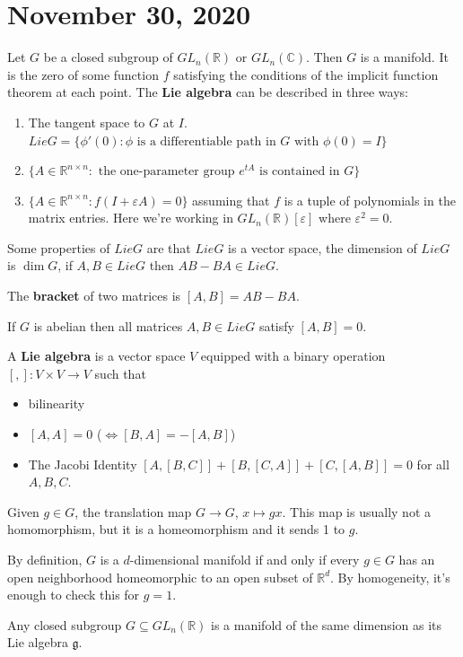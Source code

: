 \documentclass{article}
\newcommand{\vocab}[1]{\textbf{\color{blue!90}\boldmath #1}}
\newcommand{\C}{\mathbb{C}}
\newcommand{\R}{\mathbb{R}}
\newcommand{\eps}{\varepsilon}
\newcommand{\ra}[1][]{\xrightarrow{#1}}
\begin{document}
\section{November 30, 2020}
Let $G$ be a closed subgroup of $GL_n(\R)$ or $GL_n(\C)$. Then $G$ is a manifold. It is the zero of some function $f$ satisfying the conditions of the implicit function theorem at each point. The \vocab{Lie algebra} can be described in three ways:
\begin{enumerate}
    \item The tangent space to $G$ at $I$. $Lie G=\{\phi'(0):\phi\textrm{ is a differentiable path in }G\textrm{ with }\phi(0)=I\}$
    \item $\{A\in\R^{n\times n}:\textrm{ the one-parameter group }e^{tA}\textrm{ is contained in }G\}$
    \item $\{A\in\R^{n\times n}:f(I+\eps A)=0\}$ assuming that $f$ is a tuple of polynomials in the matrix entries. Here we're working in $GL_n(\R)[\eps]$ where $\eps^2=0$.
\end{enumerate}
Some properties of $Lie G$ are that $Lie G$ is a vector space, the dimension of $Lie G$ is $\dim G$, if $A,B\in Lie G$ then $AB-BA\in Lie G$. 
\begin{definition}
The \vocab{bracket} of two matrices is $[A,B]=AB-BA$.
\end{definition}
If $G$ is abelian then all matrices $A,B\in Lie G$ satisfy $[A,B]=0$.
\begin{definition}
A \vocab{Lie algebra} is a vector space $V$ equipped with a binary operation $[,]:V\times V\ra V$ such that 
\begin{itemize}
    \item bilinearity
    \item $[A,A]=0$ ($\iff [B,A]=-[A,B]$)
    \item The Jacobi Identity $[A,[B,C]]+[B,[C,A]]+[C,[A,B]]=0$ for all $A,B,C$.
\end{itemize}
\end{definition}
Given $g\in G$, the translation map $G\ra G$, $x\mapsto gx$. This map is usually not a homomorphism, but it is a homeomorphism and it sends 1 to $g$.
\begin{example}
By definition, $G$ is a $d$-dimensional manifold if and only if every $g\in G$ has an open neighborhood homeomorphic to an open subset of $\R^d$. By homogeneity, it's enough to check this for $g=1$.
\end{example}
\begin{fact}
Any closed subgroup $G\subseteq GL_n(\R)$ is a manifold of the same dimension as its Lie algebra $\mathfrak g$. 
\end{fact}
\end{document}

